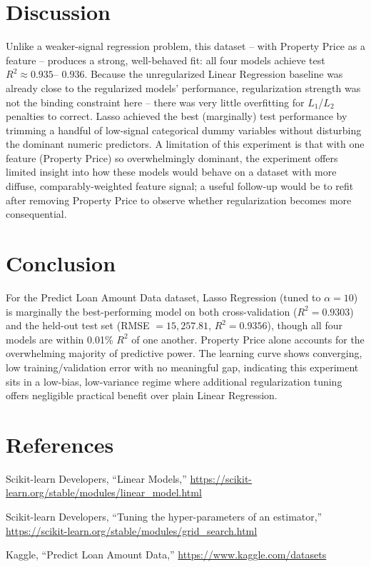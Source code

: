 \documentclass[12pt,a4paper]{article}
\begin{document}
\section{Discussion}
Unlike a weaker-signal regression problem, this dataset -- with Property Price as a feature
-- produces a strong, well-behaved fit: all four models achieve test $R^2 \approx 0.935$--
$0.936$. Because the unregularized Linear Regression baseline was already close to the
regularized models' performance, regularization strength was not the binding constraint here
-- there was very little overfitting for $L_1$/$L_2$ penalties to correct. Lasso achieved the
best (marginally) test performance by trimming a handful of low-signal categorical dummy
variables without disturbing the dominant numeric predictors. A limitation of this experiment
is that with one feature (Property Price) so overwhelmingly dominant, the experiment offers
limited insight into how these models would behave on a dataset with more diffuse,
comparably-weighted feature signal; a useful follow-up would be to refit after removing
Property Price to observe whether regularization becomes more consequential.

\section{Conclusion}
For the Predict Loan Amount Data dataset, Lasso Regression (tuned to $\alpha=10$) is
marginally the best-performing model on both cross-validation ($R^2=0.9303$) and the held-out
test set (RMSE $=15{,}257.81$, $R^2=0.9356$), though all four models are within 0.01\%
$R^2$ of one another. Property Price alone accounts for the overwhelming majority of
predictive power. The learning curve shows converging, low training/validation error with no
meaningful gap, indicating this experiment sits in a low-bias, low-variance regime where
additional regularization tuning offers negligible practical benefit over plain Linear
Regression.

\section{References}
\begin{enumerate}[label={[\arabic*]}]
\item Scikit-learn Developers, ``Linear Models,'' \url{https://scikit-learn.org/stable/modules/linear_model.html}
\item Scikit-learn Developers, ``Tuning the hyper-parameters of an estimator,'' \url{https://scikit-learn.org/stable/modules/grid_search.html}
\item Kaggle, ``Predict Loan Amount Data,'' \url{https://www.kaggle.com/datasets}
\end{enumerate}
\end{document}
